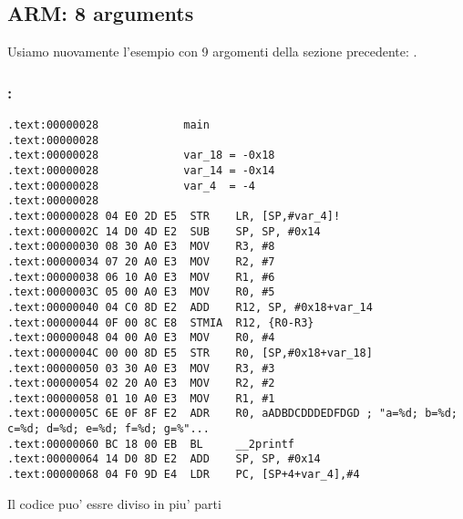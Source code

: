\subsection{ARM: 8 arguments}

Usiamo nuovamente l'esempio con 9 argomenti della sezione precedente: .



\subsubsection{\OptimizingKeilVI: \ARMMode}

\begin{lstlisting}
.text:00000028             main
.text:00000028
.text:00000028             var_18 = -0x18
.text:00000028             var_14 = -0x14
.text:00000028             var_4  = -4
.text:00000028
.text:00000028 04 E0 2D E5  STR    LR, [SP,#var_4]!
.text:0000002C 14 D0 4D E2  SUB    SP, SP, #0x14
.text:00000030 08 30 A0 E3  MOV    R3, #8
.text:00000034 07 20 A0 E3  MOV    R2, #7
.text:00000038 06 10 A0 E3  MOV    R1, #6
.text:0000003C 05 00 A0 E3  MOV    R0, #5
.text:00000040 04 C0 8D E2  ADD    R12, SP, #0x18+var_14
.text:00000044 0F 00 8C E8  STMIA  R12, {R0-R3}
.text:00000048 04 00 A0 E3  MOV    R0, #4
.text:0000004C 00 00 8D E5  STR    R0, [SP,#0x18+var_18]
.text:00000050 03 30 A0 E3  MOV    R3, #3
.text:00000054 02 20 A0 E3  MOV    R2, #2
.text:00000058 01 10 A0 E3  MOV    R1, #1
.text:0000005C 6E 0F 8F E2  ADR    R0, aADBDCDDDEDFDGD ; "a=%d; b=%d; c=%d; d=%d; e=%d; f=%d; g=%"...
.text:00000060 BC 18 00 EB  BL     __2printf
.text:00000064 14 D0 8D E2  ADD    SP, SP, #0x14
.text:00000068 04 F0 9D E4  LDR    PC, [SP+4+var_4],#4
\end{lstlisting}

Il codice puo' essre diviso in piu' parti

